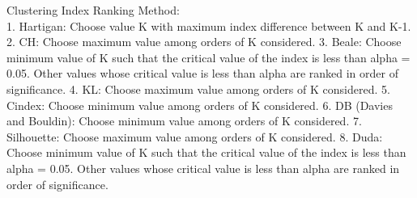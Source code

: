 \documentclass[twoside,12pt,final]{ucthesis-CA2012}
\begin{document}
\begin{ucmainmatter}
Clustering Index Ranking Method:\\
1. Hartigan: Choose value K with maximum index difference between K and K-1.
2. CH: Choose maximum value among orders of K considered.
3. Beale: Choose minimum value of K such that the critical value of the index is less than alpha = 0.05. Other values whose critical value is less than alpha are ranked in order of significance.
4. KL: Choose maximum value among orders of K considered.
5. Cindex: Choose minimum value among orders of K considered.
6. DB (Davies and Bouldin): Choose minimum value among orders of K considered.
7. Silhouette: Choose maximum value among orders of K considered.
8. Duda: Choose minimum value of K such that the critical value of the index is less than alpha = 0.05. Other values whose critical value is less than alpha are ranked in order of significance.


\end{ucmainmatter}
\end{document}
